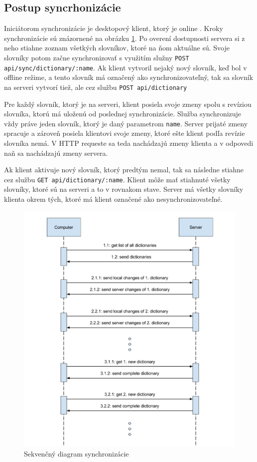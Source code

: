 \documentclass[
  digital, %
  table,   %
  lof,     %
  lot,     %
]{fithesis3}
\begin{document}
\subsection{Postup syncrhonizácie}
Iniciátorom synchronizácie je desktopový klient, ktorý je online . Kroky synchronizácie sú znázornené na obrázku \ref{fig:synchronisation}. Po overení dostupnosti servera si z neho stiahne zoznam všetkých slovníkov, ktoré na ňom aktuálne sú. Svoje slovníky potom začne synchronizovať s využitím služny \texttt{POST api/sync/dictionary/:name}. Ak klient vytvoril nejaký nový slovník, keď bol v offline režime, a tento slovník má označený ako synchronizovateľný, tak sa slovník na serveri vytvorí tiež, ale cez službu \texttt{POST api/dictionary}

Pre každý slovník, ktorý je na serveri, klient posiela svoje zmeny spolu s revíziou slovníka, ktorú má uloženú od poslednej synchronizácie. Služba synchronizuje vždy práve jeden slovník, ktorý je daný parametrom \texttt{name}. Server prijaté zmeny spracuje a zároveň posiela klientovi svoje zmeny, ktoré ešte klient podľa revízie slovníka nemá. V HTTP requeste sa teda nachádzajú zmeny klienta a v odpovedi naň sa nachádzajú zmeny servera.

Ak klient aktivuje nový slovník, ktorý predtým nemal, tak sa následne stiahne cez službu \texttt{GET api/dictionary/:name}. Klient môže mať stiahnuté všetky slovníky, ktoré sú na serveri a to v rovnakom stave. Server má všetky slovníky klienta okrem tých, ktoré má klient označené ako nesynchronizovateľné.

\begin{figure}
	\begin{center}
	\includegraphics[width=\textwidth]{img/synchronisation.png}
	\end{center}
    \caption{Sekvenčný diagram synchronizácie}
	\label{fig:synchronisation}
\end{figure}
\end{document}
